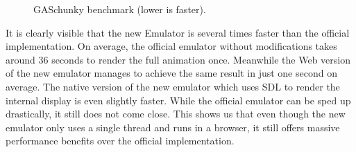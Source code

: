 \begin{figure}[ht]
  \centering
  \caption{GASchunky benchmark (lower is faster).}%
  \label{fig:gachunky-plot}
\end{figure}

It is clearly visible that the new Emulator is several times faster than the official implementation.
On average, the official emulator without modifications takes around 36 seconds to render the full animation once.
Meanwhile the Web version of the new emulator manages to achieve the same result in just one second on average.
The native version of the new emulator which uses SDL to render the internal display is even slightly faster.
While the official emulator can be sped up drastically, it still does not come close.
This shows us that even though the new emulator only uses a single thread and runs in a browser, it still offers massive performance benefits over the official implementation.
